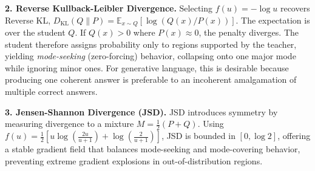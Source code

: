 \documentclass{article} %
\newcommand{\KL}{D_{\mathrm{KL}}}
\begin{document}
\textbf{2. Reverse Kullback-Leibler Divergence.} Selecting $f(u) = -\log u$ recovers Reverse KL, $\KL(Q \parallel P) = \mathbb{E}_{x \sim Q} [ \log(Q(x)/P(x)) ]$. The expectation is over the student $Q$. If $Q(x) > 0$ where $P(x) \approx 0$, the penalty diverges. The student therefore assigns probability only to regions supported by the teacher, yielding \textit{mode-seeking} (zero-forcing) behavior, collapsing onto one major mode while ignoring minor ones. For generative language, this is desirable because producing one coherent answer is preferable to an incoherent amalgamation of multiple correct answers.

\textbf{3. Jensen-Shannon Divergence (JSD).} JSD introduces symmetry by measuring divergence to a mixture $M = \frac{1}{2}(P + Q)$. Using $f(u) = \frac{1}{2}\left[u \log\left(\frac{2u}{u+1}\right) + \log\left(\frac{2}{u+1}\right)\right]$, JSD is bounded in $[0, \log 2]$, offering a stable gradient field that balances mode-seeking and mode-covering behavior, preventing extreme gradient explosions in out-of-distribution regions.
\end{document}
